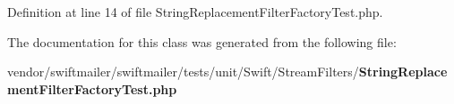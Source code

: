 Definition at line 14 of file String\+Replacement\+Filter\+Factory\+Test.\+php.



The documentation for this class was generated from the following file\+:\begin{DoxyCompactItemize}
\item 
vendor/swiftmailer/swiftmailer/tests/unit/\+Swift/\+Stream\+Filters/{\bf String\+Replacement\+Filter\+Factory\+Test.\+php}\end{DoxyCompactItemize}
